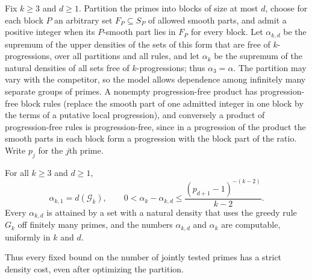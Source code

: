 Fix $k\ge3$ and $d\ge1$. Partition the primes into blocks of size at most $d$, choose for each block
$P$ an arbitrary set $F_P\subseteq S_P$ of allowed smooth parts, and admit a positive integer when its
$P$-smooth part lies in $F_P$ for every block. Let $\alpha_{k,d}$ be the supremum of the upper
densities of the sets of this form that are free of $k$-progressions, over all partitions and all
rules, and let $\alpha_k$ be the supremum of the natural densities of all sets free of
$k$-progressions; thus $\alpha_3=\alpha$. The partition may vary with the competitor, so the model
allows dependence among infinitely many separate groups of primes. A nonempty progression-free
product has progression-free block rules (replace the smooth part of one admitted integer in one
block by the terms of a putative local progression), and conversely a product of progression-free
rules is progression-free, since in a progression of the product the smooth parts in each block form
a progression with the block part of the ratio. Write $p_j$ for the $j$th prime.

\begin{theorem}\label{gpi:thm:blocksk}
For all $k\ge3$ and $d\ge1$,
\[
 \alpha_{k,1}=d(\mathcal G_k),\qquad
 0<\alpha_k-\alpha_{k,d}\le\frac{(p_{d+1}-1)^{-(k-2)}}{k-2}.
\]
Every $\alpha_{k,d}$ is attained by a set with a natural density that uses the greedy rule $G_k$ off
finitely many primes, and the numbers $\alpha_{k,d}$ and $\alpha_k$ are computable, uniformly in
$k$ and $d$.
\end{theorem}

Thus every fixed bound on the number of jointly tested primes has a strict density cost, even after
optimizing the partition.

